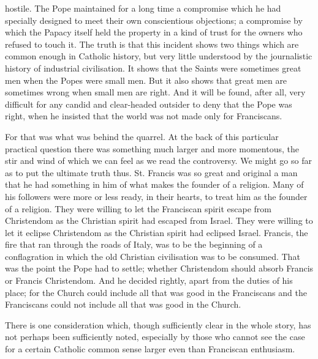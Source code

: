 \documentclass{book}
\begin{document}
hostile. The Pope maintained for a long time a compromise which he had specially designed to meet their own conscientious objections; a compromise by which the Papacy itself held the property in a kind of trust for the owners who refused to touch it. The truth is that this incident shows two things which are common enough in Catholic history, but very little understood by the journalistic history of industrial civilisation. It shows that the Saints were sometimes great men when the Popes were small men. But it also shows that great men are sometimes wrong when small men are right. And it will be found, after all, very difficult for any candid and clear-headed outsider to deny that the Pope was right, when he insisted that the world was not made only for Franciscans.

For that was what was behind the quarrel. At the back of this particular practical question there was something much larger and more momentous, the stir and wind of which we can feel as we read the controversy. We might go so far as to put the ultimate truth thus. St. Francis was so great and original a man that he had something in him of what makes the founder of a religion. Many of his followers were more or less ready, in their hearts, to treat him as the founder of a religion. They were willing to let the Franciscan spirit escape from Christendom as the Christian spirit had escaped from Israel. They were willing to let it eclipse Christendom as the Christian spirit had eclipsed Israel. Francis, the fire that ran through the roads of Italy, was to be the beginning of a conflagration in which the old Christian civilisation was to be consumed. That was the point the Pope had to settle; whether Christendom should absorb Francis or Francis Christendom. And he decided rightly, apart from the duties of his place; for the Church could include all that was good in the Franciscans and the Franciscans could not include all that was good in the Church.

There is one consideration which, though sufficiently clear in the whole story, has not perhaps been sufficiently noted, especially by those who cannot see the case for a certain Catholic common sense larger even than Franciscan enthusiasm.
\end{document}
